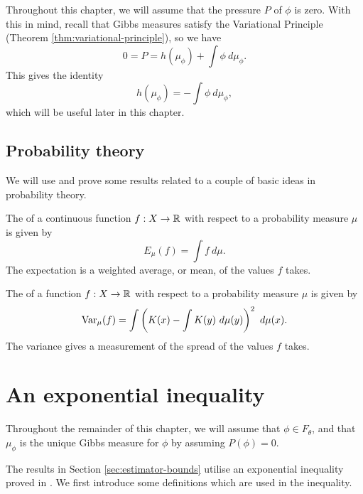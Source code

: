 Throughout this chapter, we will assume that the pressure $P$ of $\phi$ is zero. With this in mind, recall that
Gibbs measures satisfy the Variational Principle (Theorem \ref{thm:variational-principle}), so we have
\[
	0 = P = h(\mu_\phi) + \int{\phi\ d\mu_\phi}.
\]
This gives the identity
\begin{equation}\label{fml:vp-identity}
	h(\mu_\phi) = -\int{\phi\ d\mu_\phi},
\end{equation}
which will be useful later in this chapter.

\subsection{Probability theory}
We will use and prove some results related to a couple of basic ideas in probability theory.
\begin{definition}
	The  of a continuous function $f : X \to \mathbb{R}$ with respect to a probability measure $\mu$ is given by
	\[
		E_\mu(f) = \int{f\ d\mu}.
	\]
	The expectation is a weighted average, or mean, of the values $f$ takes.~\cite[p127]{gray:probability}
\end{definition}

\begin{definition}
	The  of a function $f : X \to \mathbb{R}$ with respect to a probability measure $\mu$ is given by
	\[
		\operatorname{Var}_{\mu}(f) = \int{\left(K(x) - \int{K(y)\ d\mu(y)}\right)^2\ d\mu(x)}.
	\]
	The variance gives a measurement of the spread of the values $f$ takes.
\end{definition}

\section{An exponential inequality}
Throughout the remainder of this chapter, we will assume that $\phi \in F_\theta$, and that $\mu_\phi$ is the unique Gibbs measure for $\phi$ by assuming $P(\phi) = 0$.

The results in Section \ref{sec:estimator-bounds} utilise an exponential inequality proved in \cite{collet-martinez-schmitt:exp-ineq}. We first introduce some definitions which are used in the inequality.

